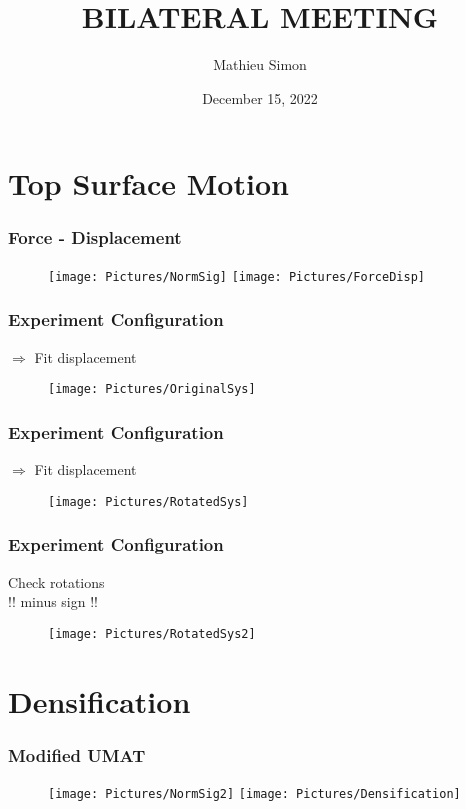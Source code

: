 \documentclass[xcolor=table,11pt]{beamer}
\title[Bilateral Meeting]{
	\uppercase{Bilateral Meeting}
}
\author{Mathieu Simon}
\date{December 15, 2022}
\begin{document}
	
	\begin{frame}
		\titlepage
	\end{frame}
	
	
	\section{Top Surface Motion}
	
	\begin{frame}
		\frametitle{Force - Displacement}
		\begin{figure}
			\texttt{[image: Pictures/NormSig]}			\texttt{[image: Pictures/ForceDisp]}
		\end{figure}
	\end{frame}

	\begin{frame}
		\frametitle{Experiment Configuration}
		$\Rightarrow$ Fit displacement
		\begin{figure}
			\texttt{[image: Pictures/OriginalSys]}
		\end{figure}
	\end{frame}

	\begin{frame}[noframenumbering]
		\frametitle{Experiment Configuration}
		$\Rightarrow$ Fit displacement
		\begin{figure}
			\texttt{[image: Pictures/RotatedSys]}
		\end{figure}
	\end{frame}

	\begin{frame}
		\frametitle{Experiment Configuration}
		Check rotations\\
		!! minus sign !!
		\begin{figure}
			\texttt{[image: Pictures/RotatedSys2]}
		\end{figure}
	\end{frame}

	\section{Densification}
	
	\begin{frame}
		\frametitle{Modified UMAT}
		\begin{figure}
			\texttt{[image: Pictures/NormSig2]}			\texttt{[image: Pictures/Densification]}
		\end{figure}
	\end{frame}
\end{document}
